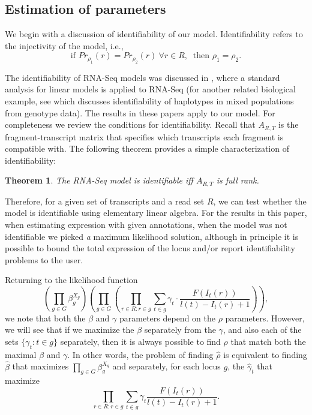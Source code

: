 \documentclass[12pt]{amsart}
\newtheorem{thm}{Theorem}
\theoremstyle{definition}
\begin{document}
\subsection{Estimation of parameters}

We begin with a discussion of identifiability of our
model. Identifiability refers to the injectivity of the model, i.e.,
\begin{equation}
\mbox{if } Pr_{\rho_1}(r) = Pr_{\rho_2}(r) \  \forall r \in R, \ \mbox{ then } \rho_1 = \rho_2.
\end{equation}


The identifiability of RNA-Seq models was discussed in
\cite{Hiller2009}, where a standard analysis for linear models is
applied to RNA-Seq (for another related biological example, see \cite{Pe'er2004} which discusses
identifiability of haplotypes in mixed populations from genotype data).
The results in these papers apply to our model. For completeness we review the conditions for
identifiability. Recall that $A_{R,T}$ is the fragment-transcript matrix that specifies which transcripts each fragment is compatible with. The following theorem provides a simple characterization of identifiability:

\begin{thm}
The RNA-Seq model is identifiable iff $A_{R,T}$ is full rank.
\end{thm}

Therefore, for a given set of transcripts and a read set $R$, we can
test whether the model is identifiable using elementary linear
algebra. For the results in this paper, when estimating expression
with given annotations, when the model was not identifiable we picked {\em a} maximum likelihood solution,
although in principle it is possible to bound the total expression of
the locus and/or report identifiability problems to the user. 

Returning to the likelihood function
\begin{equation}
\left( \prod_{g \in G}  \beta_g^{X_{g}} \right) \left( \prod_{g \in G} \left( \prod_{r \in R:r \in g} \sum_{t \in g}  \gamma_t \cdot
\frac{F(I_t(r))}{l(t)-I_t(r)+1}\right) \right),
\end{equation}
we note that both the $\beta$ and $\gamma$ parameters depend on the $\rho$ parameters. However, we will see that if we maximize the $\beta$ separately from the $\gamma$, and also each of the sets $\{\gamma_t:t \in g\}$ separately, then it is always possible to find $\rho$ that match both the maximal $\beta$ and $\gamma$. In other words, 
the problem of finding $\hat{\rho}$ is equivalent
to finding $\hat{\beta}$ that maximizes 
$ \prod_{g \in G} \beta_g^{X_g}$
and separately, for each locus $g$, the $\hat{\gamma}_t$ that maximize
\begin{equation}
\prod_{r \in R:r \in g} \sum_{t \in g}  \gamma_t
\frac{F(I_t(r))}{l(t)-I_t(r)+1}.
\end{equation}
\end{document}
